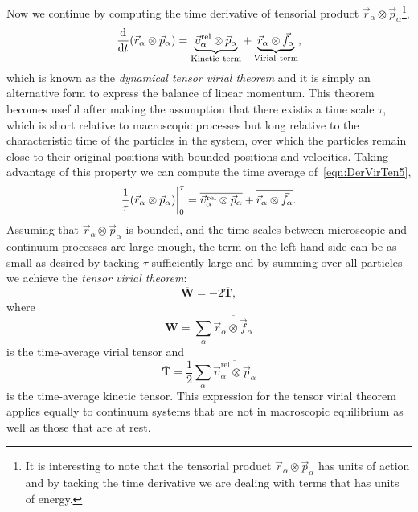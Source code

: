 Now we continue by computing the time derivative of tensorial product $\vec{r}_\alpha\otimes\vec{p}_\alpha$\footnote{It is interesting to note that the tensorial product $\vec{r}_\alpha\otimes\vec{p}_\alpha$ has units of action and by tacking the time derivative we are dealing with terms that has units of energy.
},
\begin{equation}
    \dv{t}\qty(\vec{r}_\alpha\otimes\vec{p}_\alpha) = 
    \underbrace{\vec{\upsilon}_\alpha^{\mathrm{rel}}\otimes\vec{p}_\alpha}_{\mathrm{Kinetic~term}} 
        +
        \underbrace{\vec{r}_\alpha\otimes\vec{f}_\alpha}_{\mathrm{Virial~term}},\label{eqn:DerVirTen5}
\end{equation}
which is known as the \textit{dynamical tensor virial theorem} and it is simply an alternative form to express the balance of linear momentum.
This theorem becomes useful after making the assumption that there existis a time scale $\tau$, which is short relative to macroscopic processes but long relative to the characteristic time of the particles in the system, over which the particles remain close to their original positions with bounded positions and velocities.
Taking advantage of this property we can compute the time average of~\eqref{eqn:DerVirTen5},
\begin{equation}
    \frac{1}{\tau}\qty(\vec{r}_\alpha\otimes\vec{p}_\alpha)\bigg|_{0}^{\tau} = 
    \overline{\vec{\upsilon}_\alpha^{\mathrm{rel}}\otimes\vec{p}_\alpha} 
        +
    \overline{\vec{r}_\alpha\otimes\vec{f}_\alpha}.\label{eqn:DerVirTen6}
\end{equation}
Assuming that $\vec{r}_\alpha\otimes\vec{p}_\alpha$ is bounded, and the time scales between microscopic and continuum processes are large enough, the term on the left-hand side can be as small as desired by tacking $\tau$ sufficiently large and by summing over all particles we achieve the \textit{tensor virial theorem}:
\begin{equation}
    \overline{\mathbf{W}} = -2\overline{\mathbf{T}},\label{eqn:DerVirTen7}
\end{equation}
where
\begin{equation}
    \overline{\mathbf{W}} = \sum_\alpha\overline{\vec{r}_\alpha\otimes\vec{f}_\alpha}\label{eqn:DerVirTen8}
\end{equation}
is the time-average virial tensor and
\begin{equation}
    \overline{\mathbf{T}}=\frac{1}{2}\sum_\alpha\overline{\vec{\upsilon}_\alpha^{\mathrm{rel}}\otimes\vec{p}_\alpha}\label{eqn:DerVirTen9}
\end{equation}
is the time-average kinetic tensor.
This expression for the tensor virial theorem applies equally to continuum systems that are not in macroscopic equilibrium as well as those that are at rest.

